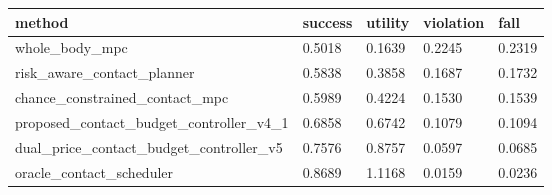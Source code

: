 \begin{tabular}{lllll}
\toprule
method & success & utility & violation & fall \\
\midrule
whole\_body\_mpc & 0.5018 & 0.1639 & 0.2245 & 0.2319 \\
risk\_aware\_contact\_planner & 0.5838 & 0.3858 & 0.1687 & 0.1732 \\
chance\_constrained\_contact\_mpc & 0.5989 & 0.4224 & 0.1530 & 0.1539 \\
proposed\_contact\_budget\_controller\_v4\_1 & 0.6858 & 0.6742 & 0.1079 & 0.1094 \\
dual\_price\_contact\_budget\_controller\_v5 & 0.7576 & 0.8757 & 0.0597 & 0.0685 \\
oracle\_contact\_scheduler & 0.8689 & 1.1168 & 0.0159 & 0.0236 \\
\bottomrule
\end{tabular}
